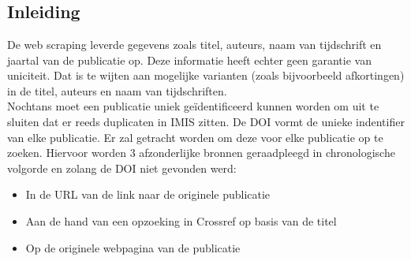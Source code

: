 
\chapter{}%
\label{ch:linked_data}

\section{Inleiding}
De web scraping leverde gegevens zoals titel, auteurs, naam van tijdschrift en jaartal van de publicatie op. Deze informatie heeft echter geen garantie van uniciteit. Dat is te wijten aan mogelijke varianten (zoals bijvoorbeeld afkortingen) in de titel, auteurs en naam van tijdschriften.\\
Nochtans moet een publicatie uniek geïdentificeerd kunnen worden om uit te sluiten dat er reeds duplicaten in IMIS zitten.
De DOI vormt de unieke indentifier van elke publicatie. Er zal getracht worden om deze voor elke publicatie op te zoeken. Hiervoor worden 3 afzonderlijke bronnen geraadpleegd in chronologische volgorde en zolang de DOI niet gevonden werd:
\begin{itemize}
    \item In de URL van de link naar de originele publicatie
    \item Aan de hand van een opzoeking in Crossref op basis van de titel
    \item Op de originele webpagina van de publicatie
\end{itemize}


